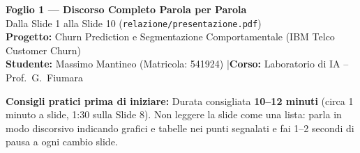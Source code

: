 \documentclass[10pt, a4paper]{article}
\begin{document}
\begin{center}
    {\LARGE \bfseries \color{PrimaryNavy} Foglio 1 --- Discorso Completo Parola per Parola}\\[4pt]
    {\large Dalla Slide 1 alla Slide 10 (\texttt{relazione/presentazione.pdf})}\\[3pt]
    {\small \textbf{Progetto:} Churn Prediction e Segmentazione Comportamentale (IBM Telco Customer Churn)\\
    \textbf{Studente:} Massimo Mantineo (Matricola: 541924) \quad|\quad \textbf{Corso:} Laboratorio di IA -- Prof.\ G.\ Fiumara}
\end{center}

\vspace{2mm}
\noindent\colorbox{LightBg}{\parbox{\dimexpr\linewidth-2\fboxsep}{
\small\textbf{Consigli pratici prima di iniziare:} Durata consigliata \textbf{10--12 minuti} (circa 1 minuto a slide, 1:30 sulla Slide 8). Non leggere la slide come una lista: parla in modo discorsivo indicando grafici e tabelle nei punti segnalati e fai 1--2 secondi di pausa a ogni cambio slide.
}}
\end{document}
